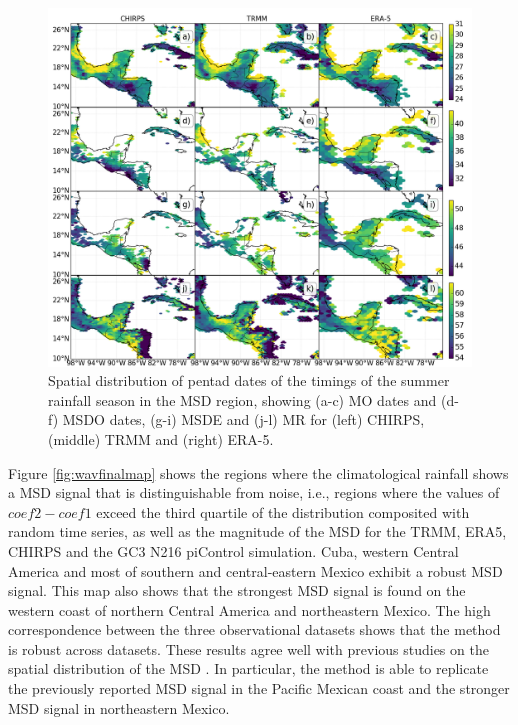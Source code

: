 \begin{figure}[t!]
\centering
 \includegraphics[width=\linewidth]{figures/wav_fig13.png}
\caption[Spatial distribution of MSD timings]{  Spatial distribution of pentad dates of the timings of the summer rainfall season in the MSD region, showing (a-c) MO dates and (d- f) MSDO dates, (g-i) MSDE and (j-l) MR for (left) CHIRPS, (middle) TRMM and (right) ERA-5. }
\label{fig:wav_fig13}
\end{figure}


Figure \ref{fig:wavfinalmap} shows the regions where the climatological rainfall shows a MSD signal that is distinguishable from noise, i.e., regions where the values of $coef2-coef1$ exceed the third quartile of the distribution composited with random time series, as well as the magnitude of the MSD for the TRMM, ERA5, CHIRPS and the GC3 N216 piControl simulation. Cuba, western Central America and most of southern and central-eastern Mexico exhibit a robust MSD signal. 
This map also shows that the strongest MSD signal is found on the western coast of northern Central America and northeastern Mexico. 
The high correspondence between the three observational datasets shows that the method is robust across datasets. These results agree well with previous studies on the spatial distribution of the MSD \citep{magana1999,perdigon2018,anderson2019multiscale,zhao2021}. In particular, the method is able to replicate the previously reported MSD signal in the Pacific Mexican coast and the stronger MSD signal in northeastern Mexico.  



